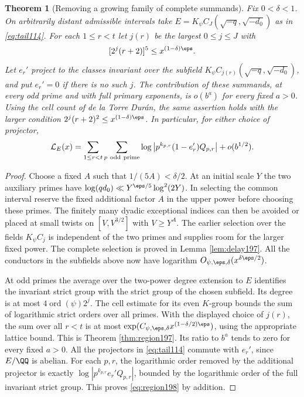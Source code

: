 \documentclass[a4paper,11pt]{article}
\newtheorem{theorem}[proposition]{Theorem}
\theoremstyle{definition}
\theoremstyle{remark}
\numberwithin{equation}{section}
\begin{document}
\begin{theorem}[Removing a growing family of complete summands]
\label{thm:region198}
Fix \(0<\delta<1\). On arbitrarily distant admissible intervals
take \(E=K_\psi C_J(\sqrt{-q},\sqrt{-d_0})\) as in
\eqref{eq:tail114}. For each \(1\le r<t\) let \(j(r)\) be the
largest \(0\le j\le J\) with
\[
             [2^j(r+2)]^5\le x^{(1-\delta)\eps}.
\]
Let \(e_r'\) project to the classes invariant over the
subfield \(K_\psi C_{j(r)}(\sqrt{-q},\sqrt{-d_0})\), and put
\(e_r'=0\) if there is no such \(j\).
The contribution of these summands, at every odd prime and
with full primary exponents, is \(o(b^a)\) for every fixed
\(a>0\). Using the cell count of de la Torre Dur\'an, the
same assertion holds with the larger condition
\(2^j(r+2)^2\le x^{(1-\delta)\eps}\).
In particular, for either choice of projector,
\begin{equation}
 \mathcal L_E(x)=\sum_{1\le r<t}\sum_{p\ {\rm odd\ prime}}
       \log\big|p^{k_{p,r}}(1-e_r')Q_{p,r}\big|+o(b^{1/2}).
 \label{eq:region198}
\end{equation}
\end{theorem}
\begin{proof}
Choose a fixed \(A\) such that \(1/(5A)<\delta/2\). At an initial
scale \(Y\) the two auxiliary primes have
\(\log(qd_0)\ll Y^{\eps/5}\log^2(2Y)\). In selecting the common
interval reserve the fixed additional factor \(A\) in the
upper power before choosing these primes. The finitely many
dyadic exceptional indices can then be avoided or placed at
small twists on \([V,V^{3/2}]\) with \(V\ge Y^A\). The earlier
selection over the fields \(K_\psi C_j\) is independent of
the two primes and supplies room for the larger fixed power.
The complete selection is proved in
Lemma \ref{lem:delay197}.
All the conductors in the subfields above now have logarithm
\(O_{\psi,\eps,\delta}(x^{\delta\eps/2})\).

At odd primes the average over the two-power degree extension
to \(E\) identifies the invariant strict group with the strict
group of the chosen subfield. Its degree is at most
\(4\operatorname{ord}(\psi)2^j\). The cell estimate for its
even \(K\)-group bounds the sum of logarithmic strict orders
over all primes. With the displayed choice of \(j(r)\), the sum
over all \(r<t\) is at most
\(\exp(C_{\psi,\eps,\delta}x^{(1-\delta/2)\eps})\), using
the appropriate lattice bound. This is
Theorem \ref{thm:region197}.
Its ratio to \(b^a\) tends to zero for every fixed \(a>0\).
All the projectors in \eqref{eq:tail114} commute with \(e_r'\),
since \(E/\QQ\) is abelian. For each \(p,r\), the logarithmic
order removed by the additional projector is exactly
\(\log|p^{k_{p,r}}e_r'Q_{p,r}|\), bounded by the logarithmic
order of the full invariant strict group. This proves
\eqref{eq:region198} by addition.
\end{proof}
\end{document}
